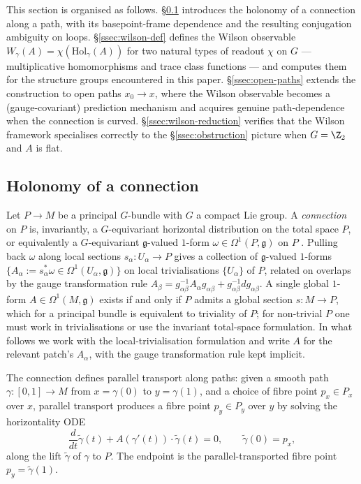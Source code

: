 This section is organised as follows. \S\ref{ssec:holonomy}
introduces the holonomy of a connection along a path, with its
basepoint-frame dependence and the resulting conjugation ambiguity
on loops. \S\ref{ssec:wilson-def} defines the Wilson observable
$W_\gamma(A)=\chi(\mathrm{Hol}_\gamma(A))$ for two natural types of
readout $\chi$ on $G$ --- multiplicative homomorphisms and trace
class functions --- and computes them for the structure groups
encountered in this paper.
\S\ref{ssec:open-paths} extends the construction to open paths
$x_0\to x$, where the Wilson observable becomes a (gauge-covariant)
prediction mechanism and acquires genuine path-dependence when the
connection is curved. \S\ref{ssec:wilson-reduction} verifies that
the Wilson framework specialises correctly to the
\S\ref{ssec:obstruction} picture when $G=\Z_2$ and $A$ is flat.

\subsection{Holonomy of a connection}\label{ssec:holonomy}

Let $P\to M$ be a principal $G$-bundle with $G$ a compact Lie group.
A \emph{connection} on $P$ is, invariantly, a $G$-equivariant
horizontal distribution on the total space $P$, or equivalently a
$G$-equivariant $\mathfrak{g}$-valued $1$-form $\omega\in\Omega^1(P,\mathfrak{g})$
on $P$ \cite[Chapter~II]{KobayashiNomizu}. Pulling back $\omega$ along
local sections $s_\alpha\colon U_\alpha\to P$ gives a collection of
$\mathfrak{g}$-valued $1$-forms
$\{A_\alpha:=s_\alpha^*\omega\in\Omega^1(U_\alpha,\mathfrak{g})\}$ on
local trivialisations $\{U_\alpha\}$ of $P$, related on overlaps by
the gauge transformation rule $A_\beta=g_{\alpha\beta}^{-1}A_\alpha
g_{\alpha\beta}+g_{\alpha\beta}^{-1}dg_{\alpha\beta}$. A single
global $1$-form $A\in\Omega^1(M,\mathfrak{g})$ exists if and only if
$P$ admits a global section $s\colon M\to P$, which for a principal
bundle is equivalent to triviality of $P$; for non-trivial $P$ one
must work in trivialisations or use the invariant total-space
formulation. In what
follows we work with the local-trivialisation formulation and write
$A$ for the relevant patch's $A_\alpha$, with the gauge transformation
rule kept implicit.

The connection defines parallel transport along paths: given a
smooth path $\gamma\colon[0,1]\to M$ from $x=\gamma(0)$ to
$y=\gamma(1)$, and a choice of fibre point $p_x\in P_x$ over
$x$, parallel transport produces a fibre point $p_y\in P_y$ over
$y$ by solving the horizontality ODE
\[
   \frac{d}{dt}\tilde\gamma(t) + A(\gamma'(t))\cdot\tilde\gamma(t) = 0,
   \qquad \tilde\gamma(0)=p_x,
\]
along the lift $\tilde\gamma$ of $\gamma$ to $P$. The endpoint is the
parallel-transported fibre point $p_y=\tilde\gamma(1)$.

